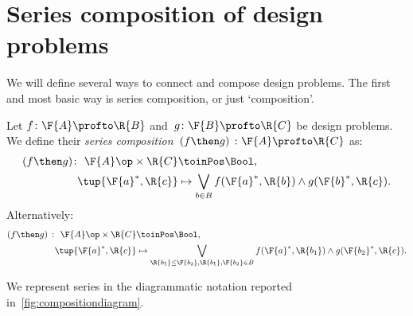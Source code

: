 %
%
%


\section{Series composition of design problems}

We will define several ways to connect and compose design problems. The first and most basic way is series composition, or just `composition'.

\begin{definition} \label{def:dp-series}
    Let $f \colon  \F{A} \profto \R{B}$ and~$g \colon \F{B} \profto \R{C}$ be design problems. We define their \emph{series composition}~$(f\then g)\ \colon  \F{A} \profto \R{C}$ as:
    \begin{equation}
        \label{eq:composition2}
        \begin{aligned}
        (f \then g)
            \colon \ \F{A}\op \times \R{C} & \toinPos  \Bool, \\
            \tup{\F{a}^*, \R{c}} &\mapsto \bigvee_{b\in B} f(\F{a}^*,\R{b}) \wedge g(\F{b}^*,\R{c}).
        \end{aligned}
    \end{equation}
    Alternatively:
    \begin{equation}
        \begin{aligned}
            \label{eq:composition}
            (f \then g)\  \colon \ \F{A}\op \times \R{C} & \toinPos  \Bool,  \\
            \tup{\F{a}^*, \R{c}} &\mapsto \bigvee_{\R{b_1}\leq\F{b_2}, \R{b_1},\F{b_2}\in B} f(\F{a}^*,\R{b_1}) \wedge g(\F{b_2}^*,\R{c}).
        \end{aligned}
    \end{equation}
\end{definition}
We represent series in the diagrammatic notation reported in~\cref{fig:compositiondiagram}.


